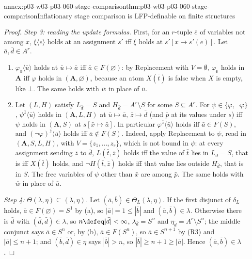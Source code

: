 \begin{annexitem}{annex:p03-w03-p03-060-stage-comparison}{thm:p03-w03-p03-060-stage-comparison}{Inflationary stage comparison is LFP-definable on finite structures}
\begin{proof}
\emph{Step 3: reading the update formulas.} First, for an \(r\)-tuple
\(\bar e\) of variables not among \(\bar x\), \(\xi\langle\bar e\rangle\)
holds at an assignment \(s'\) iff \(\xi\) holds at
\(s'[\bar x\mapsto s'(\bar e)]\). Let \(\bar a,\bar d\in A^r\).
\begin{enumerate}
\item[(a)] \(\varphi_0\langle\bar u\rangle\) holds at
      \(\bar u\mapsto\bar a\) iff \(\bar a\in F(\varnothing)\): by
      Replacement with \(V=\emptyset\), \(\varphi_0\) holds in
      \(\mathbf A\) iff \(\varphi\) holds in \((\mathbf A,\varnothing)\),
      because an atom \(X(\bar t)\) is false when \(X\) is empty, like
      \(\bot\). The same holds with \(\bar w\) in place of \(\bar u\).
\item[(b)] Let \((L,H)\) satisfy \(L_{\bar d}=S\) and
      \(H_{\bar d}=A^r\setminus S\) for some \(S\subseteq A^r\). For
      \(\psi\in\{\varphi,\neg\varphi\}\), \(\psi^{\bar z}\langle\bar u\rangle\)
      holds in \((\mathbf A,L,H)\) at \(\bar u\mapsto\bar a\),
      \(\bar z\mapsto\bar d\) (and \(\bar p\) at its values under \(s\))
      iff \(\psi\) holds in \((\mathbf A,S)\) at \(s[\bar x\mapsto\bar a]\).
      In particular \(\varphi^{\bar z}\langle\bar u\rangle\) holds iff
      \(\bar a\in F(S)\), and \((\neg\varphi)^{\bar z}\langle\bar u\rangle\)
      holds iff \(\bar a\notin F(S)\). Indeed, apply Replacement to
      \(\psi\), read in \((\mathbf A,S,L,H)\), with
      \(V=\{z_1,\ldots,z_r\}\), which is not bound in \(\psi\): at every
      assignment sending \(\bar z\) to \(\bar d\), \(L(\bar t,\bar z)\)
      holds iff the value of \(\bar t\) lies in \(L_{\bar d}=S\), that is
      iff \(X(\bar t)\) holds, and \(\neg H(\bar t,\bar z)\) holds iff that
      value lies outside \(H_{\bar d}\), that is in \(S\). The free
      variables of \(\psi\) other than \(\bar x\) are among \(\bar p\). The
      same holds with \(\bar w\) in place of \(\bar u\).
\end{enumerate}

\emph{Step 4: \(\Theta(\lambda,\eta)\subseteq(\lambda,\eta)\).} Let
\((\bar a,\bar b)\in\Theta_L(\lambda,\eta)\). If the first disjunct of
\(\delta_L\) holds, \(\bar a\in F(\varnothing)=S^1\) by (a), so
\(|\bar a|=1\le|\bar b|\) and \((\bar a,\bar b)\in\lambda\). Otherwise
there is \(\bar d\) with \((\bar d,\bar d)\in\lambda\), so
\(n\defeq|\bar d|<\infty\), \(\lambda_{\bar d}=S^n\) and
\(\eta_{\bar d}=A^r\setminus S^n\); the middle conjunct says
\(\bar a\in S^n\) or, by (b), \(\bar a\in F(S^n)\), so
\(\bar a\in S^{n+1}\) by (R3) and \(|\bar a|\le n+1\); and
\((\bar b,\bar d)\in\eta\) says \(|\bar b|>n\), so
\(|\bar b|\ge n+1\ge|\bar a|\). Hence \((\bar a,\bar b)\in\lambda\).


\end{proof}
\end{annexitem}
